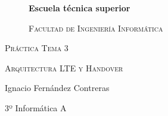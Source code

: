 \documentclass{article}
\begin{document}
\begin{titlepage}
\centering
\begin{figure}
\centering
{\bfseries\LARGE Escuela técnica superior\par}
\vspace{0.5cm}
{\scshape\Large Facultad de Ingeniería Informática\par}
\vspace{1cm}
\centering
\begin{Huge}
\begin{center}

\end{center}

\vspace{2cm}
\end{Huge}
\end{figure}


{\scshape\Huge Práctica Tema 3\par}
{\scshape\Large Arquitectura LTE y Handover\par}
\vspace{8cm}
{\Large Ignacio Fernández Contreras\par}
{\Large 3º Informática A\par}
\vfill

\end{titlepage}
\clearpage\hbox{}
\thispagestyle{empty}
\newpage

\newpage
\tableofcontents

\newpage
\end{document}
